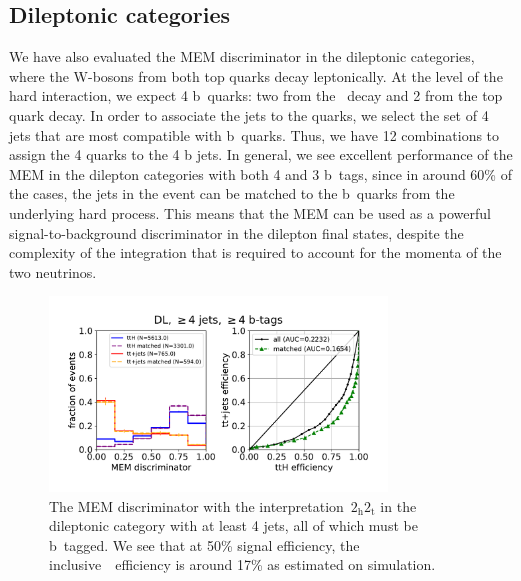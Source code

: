 \subsection{Dileptonic categories}
We have also evaluated the MEM discriminator in the dileptonic categories, where the W-bosons from both top quarks decay leptonically. At the level of the hard interaction, we expect 4 b~quarks: two from the \Hbb~decay and 2 from the top quark decay. In order to associate the jets to the quarks, we select the set of 4 jets that are most compatible with b~quarks. Thus, we have 12 combinations to assign the 4 quarks to the 4 b jets. In general, we see excellent performance of the MEM in the dilepton categories with both 4 and 3 b~tags, since in around 60\% of the cases, the jets in the event can be matched to the b~quarks from the underlying hard process. This means that the MEM can be used as a powerful signal-to-background discriminator in the dilepton final states, despite the complexity of the integration that is required to account for the momenta of the two neutrinos.


\begin{figure}[ht]
\begin{centering}
\includegraphics[width = 0.8\textwidth]{figures/mem/mem_dl_jge4_tge4.pdf}
\caption[MEM with the~$2_{\mathrm{h}} 2_{\mathrm{t}}$ interpretation in the dileptonic $\ge4$ jet, $\ge4$ b~tag category]{The MEM discriminator with the interpretation~$2_{\mathrm{h}} 2_{\mathrm{t}}$ in the dileptonic category with at least 4 jets, all of which must be b~tagged. We see that at 50\% signal efficiency, the inclusive~\ttbar~efficiency is around 17\% as estimated on simulation.}
\label{fig:mem_dl_jge4_tge4}
\end{centering}
\end{figure}

